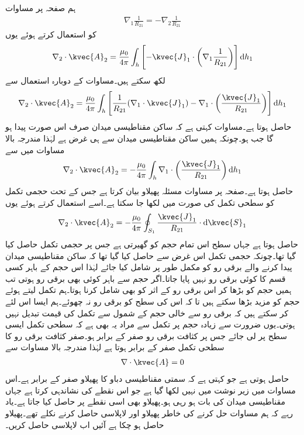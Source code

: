 ہم صفحہ  پر مساوات 
\begin{align*}
\nabla_1 \frac{1}{R_{21}}=-\nabla_2 \frac{1}{R_{21}}
\end{align*}
کو استعمال کرتے ہوئے یوں 
\begin{align}
\nabla_2 \cdot \kvec{A}_2=\frac{\mu_0}{4\pi}\int_h \left[-\kvec{J}_1 \cdot \left(\nabla_1 \frac{1}{R_{21}}\right)\right] \dif h_1
\end{align}
لکھ سکتے ہیں۔مساوات  کے دوبارہ استعمال سے 
\begin{align}
\nabla_2 \cdot \kvec{A}_2=\frac{\mu_0}{4\pi}\int_h \left[\frac{1}{R_{21}} (\nabla_1 \cdot \kvec{J}_1)-\nabla_1 \cdot \left(\frac{\kvec{J}_1}{R_{21}} \right)\right] \dif h_1
\end{align}
حاصل ہوتا ہے۔مساوات  کہتی ہے کہ ساکن مقناطیسی میدان صرف اس صورت پیدا ہو گا جب  ہو۔چونکہ ہمیں ساکن مقناطیسی میدان سے ہی غرض ہے لہٰذا مندرجہ بالا مساوات میں سے
\begin{align}
\nabla_2 \cdot \kvec{A}_2=-\frac{\mu_0}{4\pi}\int_h \nabla_1 \cdot \left(\frac{\kvec{J}_1}{R_{21}} \right) \dif h_1
\end{align}
حاصل ہوتا ہے۔صفحہ  پر مساوات  مسئلہ پھیلاو بیان کرتا ہے جس کے تحت حجمی تکمل کو سطحی تکمل کی صورت میں لکھا جا سکتا ہے۔اسے استعمال کرتے ہوئے یوں
\begin{align}
\nabla_2 \cdot \kvec{A}_2=-\frac{\mu_0}{4\pi}\oint_{S_1} \frac{\kvec{J}_1}{R_{21}} \cdot \dif \kvec{S}_1
\end{align}
حاصل ہوتا ہے جہاں سطح  اس تمام حجم کو گھیرتی ہے جس پر حجمی تکمل حاصل کیا گیا تھا۔چونکہ حجمی تکمل اس غرض سے حاصل کیا گیا تھا کہ ساکن مقناطیسی میدان پیدا کرنے والے برقی رو کو مکمل طور پر شامل کیا جائے  لہٰذا اس حجم کے باہر کسی قسم کا کوئی برقی رو نہیں پایا جاتا۔اگر حجم سے باہر کوئی بھی برقی رو ہوتی تب ہمیں حجم کو بڑھا کر اس برقی رو کے اثر کو بھی شامل کرنا ہوتا۔ہم تکمل لیتے ہوئے حجم کو مزید بڑھا سکتے ہیں تا کہ اس کی سطح کو برقی رو نہ چھوئے۔ہم ایسا اس لئے کر سکتے ہیں کہ برقی رو سے خالی حجم کے شمول سے تکمل کی قیمت تبدیل نہیں ہوتی۔یوں ضرورت سے زیادہ حجم پر تکمل سے مراد یہ بھی ہے کہ سطحی تکمل ایسی سطح پر لی جائے جس پر کثافت برقی رو صفر کے برابر ہو۔صفر کثافت برقی رو کا سطحی تکمل صفر کے برابر ہوتا ہے لہٰذا مندرجہ بالا مساوات سے
\begin{align}\label{مساوات_مقناطیسی_سمتی_مقناطیسی_دباو_کی_پھیلاو_صفر_ہے}
\nabla \cdot \kvec{A}=0
\end{align}
حاصل ہوتی ہے جو کہتی ہے کہ سمتی مقناطیسی دباو کا پھیلاو صفر کے برابر ہے۔اس مساوات میں زیر نوشت میں  نہیں لکھا گیا ہے جو اس نقطے کی نشاندہی کرتا ہے جہاں مقناطیسی میدان کی بات ہو رہی ہو۔پھیلاو بھی اسی نقطے پر حاصل کیا جاتا ہے۔یاد رہے کہ ہم مساوات  حل کرنے کی خاطر پھیلاو اور لاپلاسی حاصل کرنے نکلے تھے۔پھیلاو حاصل ہو چکا ہے آئیں اب لاپلاسی حاصل کریں۔  

